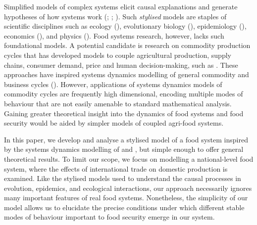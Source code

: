 \documentclass[12pt]{article}
\begin{document}
Simplified models of complex systems elicit causal explanations and generate hypotheses of how systems work (\cite{smaldino2017}; \cite{smaldino2019}; \cite{otto2020}). Such \textit{stylised} models are staples of scientific disciplines such as ecology (\cite{may1973}), evolutionary biology (\cite{boyd2003}), epidemiology (\cite{kermack1927}), economics (\cite{nerlove1958}), and physics (\cite{strogatz1994}). Food systems research, however, lacks such foundational models. A potential candidate is research on commodity production cycles that has developed models to couple agricultural production, supply chains, consumer demand, price and human decision-making, such as \textcite{meadows1971}. These approaches have inspired systems dynamics modelling of general commodity and business cycles (\cite{sterman2000}). However, applications of systems dynamics models of commodity cycles are frequently high dimensional, encoding multiple modes of behaviour that are not easily amenable to standard mathematical analysis. Gaining greater theoretical insight into the dynamics of food systems and food security would be aided by simpler models of coupled agri-food systems.

In this paper, we develop and analyse a stylised model of a food system inspired by the systems dynamics modelling of \textcite{meadows1971} and \cite{sterman2000}, but simple enough to offer general theoretical results. To limit our scope, we focus on modelling a national-level food system, where the effects of international trade on domestic production is examined. Like the stylised models used to understand the causal processes in evolution, epidemics, and ecological interactions, our approach necessarily ignores many important features of real food systems. Nonetheless, the simplicity of our model allows us to elucidate the precise conditions under which different stable modes of behaviour important to food security emerge in our system.
\end{document}
